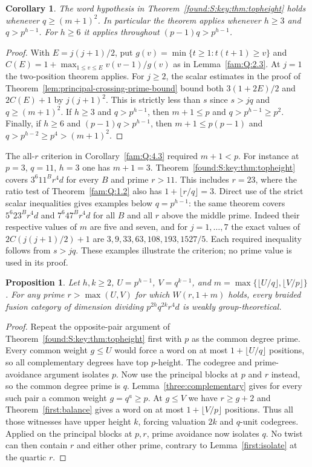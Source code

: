 \documentclass[11pt,a4paper]{article}
\numberwithin{equation}{section}
\newtheorem{proposition}[theorem]{Proposition}
\newtheorem{corollary}[theorem]{Corollary}
\theoremstyle{remark}
\begin{document}
\begin{corollary}\label{found:S:2.2}\label{found:S:key:cor:topheight}
The word hypothesis in Theorem~\ref{found:S:key:thm:topheight} holds whenever
$q\ge(m+1)^2$. In particular the theorem applies whenever $h\ge3$ and
$q>p^{h-1}$. For $h\ge6$ it applies throughout $(p-1)q>p^{h-1}$.
\end{corollary}
\begin{proof}
With $E=j(j+1)/2$, put $g(v)=\min\{t\ge1:t(t+1)\ge v\}$
and $C(E)=1+\max_{1\le v\le E}v(v-1)/g(v)$ as in
Lemma~\ref{fam:Q:2.3}. At $j=1$ the two-position theorem applies.
For $j\ge2$, the scalar
estimates in the proof of Theorem~\ref{lem:principal-crossing-prime-bound}
bound both $3(1+2E)/2$ and $2C(E)+1$ by $j(j+1)^2$.
This is strictly less than $s$ since $s>jq$ and $q\ge(m+1)^2$. If $h\ge3$ and $q>p^{h-1}$, then
$m+1\le p$ and $q>p^{h-1}\ge p^2$. Finally, if $h\ge6$ and
$(p-1)q>p^{h-1}$, then $m+1\le p(p-1)$ and
$q>p^{h-2}\ge p^4>(m+1)^2$.
\end{proof}

The all-$r$ criterion in Corollary~\ref{fam:Q:4.3} required
$m+1<p$. For instance at $p=3$, $q=11$, $h=3$ one has $m+1=3$.
Theorem~\ref{found:S:key:thm:topheight} covers $3^6 11^B r^4d$ for every
$B$ and prime $r>11$. This includes $r=23$, where the ratio test of
Theorem~\ref{fam:Q:1.2} also has $1+\lfloor r/q\rfloor=3$. Direct use of
the strict scalar inequalities gives examples below $q=p^{h-1}$:
the same theorem covers $5^6 23^B r^4d$ and $7^6 47^B r^4d$ for all
$B$ and all $r$ above the middle prime. Indeed their respective values
of $m$ are five and seven, and for $j=1,\ldots,7$ the exact values of
$2C(j(j+1)/2)+1$ are $3,9,33,63,108,193,1527/5$. Each required
inequality follows from $s>jq$. These examples illustrate the criterion;
no prime value is used in its proof.

\begin{proposition}\label{found:S:2.3}\label{found:S:key:prop:twoisolated}
Let $h,k\ge2$, $U=p^{h-1}$, $V=q^{k-1}$, and
$m=\max\{\lfloor U/q\rfloor,\lfloor V/p\rfloor\}$.
For any prime $r>\max(U,V)$ for which $W(r,1+m)$ holds,
every braided fusion category of dimension dividing
$p^{2h}q^{2k}r^4d$ is weakly group-theoretical.
\end{proposition}
\begin{proof}
Repeat the opposite-pair argument of Theorem~\ref{found:S:key:thm:topheight}
first with $p$ as the common degree prime. Every common weight $g\le U$
would force a word on at most $1+\lfloor U/q\rfloor$ positions, so
all complementary degrees have top $p$-height. The codegree and
prime-avoidance argument isolates $p$. Now use the principal blocks
at $p$ and $r$ instead, so the common degree prime is $q$. Lemma~\ref{three:complementary}
gives for every such pair a common weight $g=q^a\ge p$. At $g\le V$
we have $r\ge g+2$ and Theorem~\ref{first:balance} gives a word on at most
$1+\lfloor V/p\rfloor$ positions. Thus all those witnesses have upper
height $k$, forcing valuation $2k$ and $q$-unit codegrees. Applied
on the principal blocks at $p,r$, prime avoidance now isolates $q$.
No twist can then contain $r$ and either other prime, contrary to Lemma~\ref{first:isolate} at the quartic $r$.
\end{proof}
\end{document}

